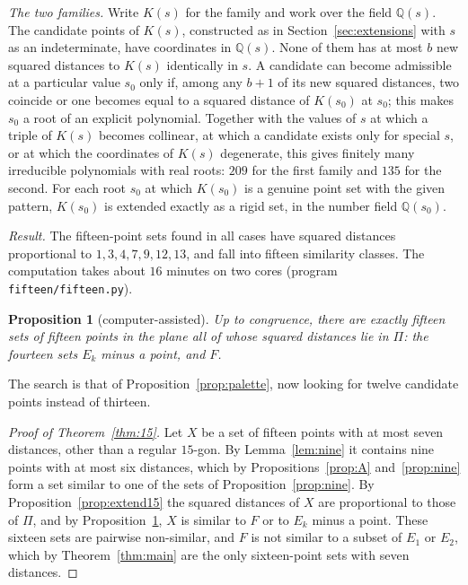 \documentclass[11pt]{amsart}
\newtheorem{proposition}[theorem]{Proposition}
\theoremstyle{definition}
\theoremstyle{remark}
\newcommand{\Q}{\mathbb{Q}}
\begin{document}
\emph{The two families.} Write $K(s)$ for the family and work over the field $\Q(s)$. The candidate points of
$K(s)$, constructed as in Section~\ref{sec:extensions} with $s$ as an indeterminate, have coordinates in
$\Q(s)$. None of them has at most $b$ new squared distances to $K(s)$ identically in $s$. A candidate can become
admissible at a particular value $s_0$ only if, among any $b+1$ of its new squared distances, two coincide or
one becomes equal to a squared distance of $K(s_0)$ at $s_0$; this makes $s_0$ a root of an explicit
polynomial. Together with the values of $s$ at which a triple of $K(s)$ becomes collinear, at which a
candidate exists only for special $s$, or at which the coordinates of $K(s)$ degenerate, this gives finitely
many irreducible polynomials with real roots: $209$ for the first family and $135$ for the second.
For each root $s_0$ at which $K(s_0)$ is a genuine point set with the given pattern, $K(s_0)$ is extended exactly
as a rigid set, in the number field $\Q(s_0)$.

\emph{Result.} The fifteen-point sets found in all cases have squared distances proportional to
$1,3,4,7,9,12,13$, and fall into fifteen similarity classes. The computation takes about $16$ minutes on two
cores (program \texttt{fifteen/fifteen.py}).

\begin{proposition}[computer-assisted]\label{prop:palette15}
Up to congruence, there are exactly fifteen sets of fifteen points in the plane all of whose squared distances
lie in $\Pi$: the fourteen sets $E_k$ minus a point, and $F$.
\end{proposition}

The search is that of Proposition~\ref{prop:palette}, now looking for twelve candidate points instead of thirteen.

\begin{proof}[Proof of Theorem~\ref{thm:15}]
Let $X$ be a set of fifteen points with at most seven distances, other than a regular $15$-gon. By
Lemma~\ref{lem:nine} it contains nine points with at most six distances, which by Propositions~\ref{prop:A}
and~\ref{prop:nine} form a set similar to one of the sets of Proposition~\ref{prop:nine}. By
Proposition~\ref{prop:extend15} the squared distances of $X$ are proportional to those of $\Pi$, and by
Proposition~\ref{prop:palette15}, $X$ is similar to $F$ or to $E_k$ minus a point. These sixteen sets are
pairwise non-similar, and $F$ is not similar to a subset of $E_1$ or $E_2$, which by
Theorem~\ref{thm:main} are the only sixteen-point sets with seven distances.
\end{proof}
\end{document}
